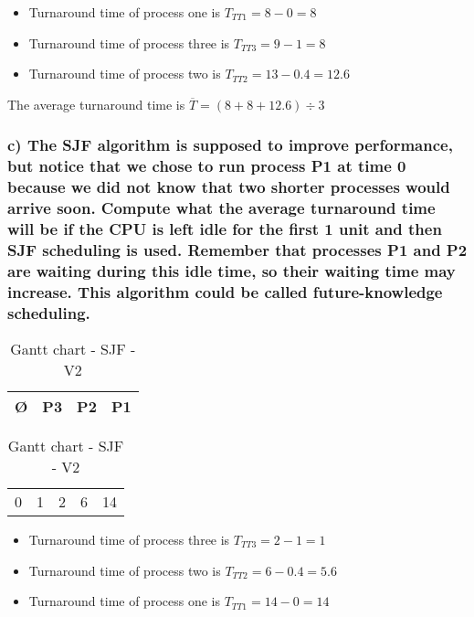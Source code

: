 \documentclass[11pt]{article}
\begin{document}
\begin{itemize}
    \item Turnaround time of process one is $T_{TT1} = 8 - 0 = 8$
    \item Turnaround time of process three is $T_{TT3} = 9 - 1 = 8$
    \item Turnaround time of process two is $T_{TT2} = 13 - 0.4 = 12.6$
\end{itemize}

The average turnaround time is $\overline T = (8 + 8 + 12.6) \div 3 $

\subsubsection*{c) The SJF algorithm is supposed to 
improve performance, but notice that we chose to run process P1 
at time 0 because we did not know that two shorter processes 
would arrive soon. Compute what the average turnaround time will 
be if the CPU is left idle for the first 1 unit and then SJF 
scheduling is used. Remember that processes P1 and P2 are 
waiting during this idle time, so their waiting time may 
increase. This algorithm could be called future-knowledge 
scheduling.} 

\begin{table}[!htp]
    \centering            %
    \def\arraystretch{2}  %
    
    \begin{tabular}{|m{1cm}|m{1cm}|m{4cm}|m{8cm}|}
        \hline
        \O & P3 & P2 & P1 \\
        \hline
    \end{tabular}

    \begin{tabular}{m{1cm} m{1cm} m{4cm} m{8cm} l }
        0 & 1 & 2 & 6 & 14 \\
    \end{tabular}
    
    \caption{Gantt chart - SJF - V2}
\end{table}

\begin{itemize}
    \item Turnaround time of process three is $T_{TT3} = 2 - 1 = 1$
    \item Turnaround time of process two is $T_{TT2} = 6 - 0.4 = 5.6$
    \item Turnaround time of process one is $T_{TT1} = 14 - 0 = 14$
\end{itemize}
\end{document}
